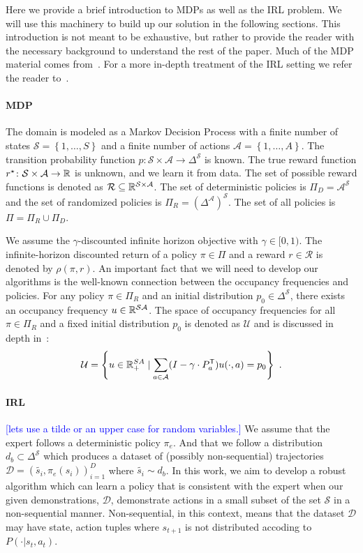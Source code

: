 \documentclass[11pt]{uai2023}
\newcommand{\mm}[1]{\textcolor{blue}{[#1]}}
\begin{document}
Here we provide a brief introduction to MDPs as well as the IRL problem. We will use this machinery to build up our solution in the following sections.
This introduction is not meant to be exhaustive, but rather to provide the reader with the necessary background to understand the rest of the paper.
Much of the MDP material comes from~\cite{Puterman1994}. For a more in-depth treatment of the IRL setting we refer the reader to~\cite{abbeel2004}.

\paragraph{MDP}
The domain is modeled as a Markov Decision Process with a finite number of states $\mathcal{S} = \left\{ 1, \dots , S \right\}$ and a finite number of actions $\mathcal{A} = \left\{ 1, \dots , A \right\}$. The transition probability function $p\colon \mathcal{S} \times \mathcal{A} \to \Delta^{\mathcal{S}}$ is known. The true reward function $r^{\mathnormal{\star}} \colon \mathcal{S} \times \mathcal{A} \to \mathbb{R}$ is unknown, and we learn it from data. The set of possible reward functions is denoted as $\mathcal{R} \subseteq \mathbb{R}^{\mathcal{S} \times \mathcal{A}}$. The set of deterministic policies is $\Pi_D= \mathcal{A}^{\mathcal{S}}$ and the set of randomized policies is $\Pi_R = {\left(\Delta^{\mathcal{A}}\right)}^{\mathcal{S}}$. The set of all policies is $\Pi = \Pi_R \cup \Pi_D$.

We assume the $\gamma$-discounted infinite horizon objective with $\gamma \in [0,1)$.
The infinite-horizon discounted return of a policy $\pi \in \Pi$ and a reward $r \in \mathcal{R}$ is denoted by $\rho(\pi, r)$.
An important fact that we will need to develop our algorithms is the well-known connection between the occupancy frequencies and policies.
For any policy $\pi\in\Pi_R$ and an initial distribution $p_0\in \Delta^{\mathcal{S}}$, there exists an occupancy frequency $u\in \mathbb{R}^{\mathcal{S}\mathcal{A}}$.
The space of occupancy frequencies for all $\pi\in \Pi_R$ and a fixed initial distribution $p_0$ is denoted as $\mathcal{U}$
and is discussed in depth in~\cite{Puterman1994}:
\[
	\mathcal{U} = \left\{ u\in \mathbb{R}^{SA}_{+} \mid \sum_{a\in \mathcal{A}} (I - \gamma\cdot P^{\mathsf{T}}_a) u(\cdot, a) = p_0 \right\}~.
\]

\paragraph{IRL}
\mm{lets use a tilde or an upper case for random variables.}
We assume that the expert follows a deterministic policy $\pi_e$. And that we follow a distribution $d_b \subset \Delta^{\mathcal{S}}$ which produces a dataset of (possibly non-sequential) trajectories $\mathcal{D} = {(\tilde{s_i}, \pi_e(s_i))}_{i=1}^D$ where $\tilde{s_i} \sim d_b$. In this work, we aim
to develop a robust algorithm which can learn a policy that is
consistent with the expert when our given demonstrations, $\mathcal{D}$,
demonstrate actions in a small subset of the set $\mathcal{S}$ in a
non-sequential manner. Non-sequential, in this context, means that the dataset $\mathcal{D}$ may have state, action tuples where $s_{t+1}$ is not distributed accoding to $P(\cdot | s_t, a_t)$. 
\end{document}
